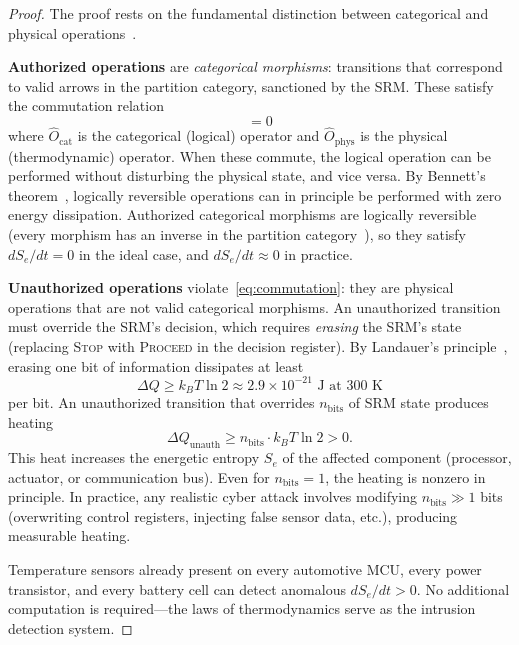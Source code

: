 \documentclass[twocolumn,10pt]{article}
\theoremstyle{definition}
\newcommand{\Se}{S_e}
\newcommand{\Ocat}{\hat{O}_{\mathrm{cat}}}
\newcommand{\Ophys}{\hat{O}_{\mathrm{phys}}}
\begin{document}
\begin{proof}
The proof rests on the fundamental distinction between categorical and physical operations~\cite{landauer1961,bennett1973,bennett1982,sachikonye2026trajectory}.

\textbf{Authorized operations} are \emph{categorical morphisms}: transitions that correspond to valid arrows in the partition category, sanctioned by the SRM. These satisfy the commutation relation
\begin{equation}
[\Ocat, \Ophys] = 0
\label{eq:commutation}
\end{equation}
where $\Ocat$ is the categorical (logical) operator and $\Ophys$ is the physical (thermodynamic) operator. When these commute, the logical operation can be performed without disturbing the physical state, and vice versa. By Bennett's theorem~\cite{bennett1973}, logically reversible operations can in principle be performed with zero energy dissipation. Authorized categorical morphisms are logically reversible (every morphism has an inverse in the partition category~\cite{awodey2010,maclane1998}), so they satisfy $d\Se/dt = 0$ in the ideal case, and $d\Se/dt \approx 0$ in practice.

\textbf{Unauthorized operations} violate~\eqref{eq:commutation}: they are physical operations that are not valid categorical morphisms. An unauthorized transition must override the SRM's decision, which requires \emph{erasing} the SRM's state (replacing \textsc{Stop} with \textsc{Proceed} in the decision register). By Landauer's principle~\cite{landauer1961}, erasing one bit of information dissipates at least
\begin{equation}
\Delta Q \geq k_B T \ln 2 \approx 2.9 \times 10^{-21} \text{ J at 300 K}
\end{equation}
per bit. An unauthorized transition that overrides $n_{\mathrm{bits}}$ of SRM state produces heating
\begin{equation}
\Delta Q_{\mathrm{unauth}} \geq n_{\mathrm{bits}} \cdot k_B T \ln 2 > 0.
\end{equation}
This heat increases the energetic entropy $\Se$ of the affected component (processor, actuator, or communication bus). Even for $n_{\mathrm{bits}} = 1$, the heating is nonzero in principle. In practice, any realistic cyber attack involves modifying $n_{\mathrm{bits}} \gg 1$ bits (overwriting control registers, injecting false sensor data, etc.), producing measurable heating.

Temperature sensors already present on every automotive MCU, every power transistor, and every battery cell can detect anomalous $d\Se/dt > 0$. No additional computation is required---the laws of thermodynamics serve as the intrusion detection system.
\end{proof}
\end{document}
